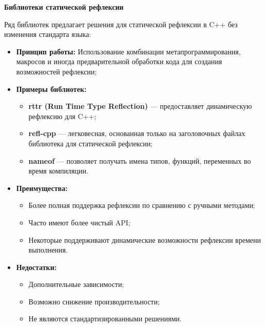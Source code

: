         \textbf{Библиотеки статической рефлексии}
        
            Ряд библиотек предлагает решения для статической рефлексии в C++ без изменения стандарта языка:
            
            \begin{itemize}
                \item \textbf{Принцип работы:} Использование комбинации метапрограммирования, макросов и иногда предварительной обработки кода для создания возможностей рефлексии;
                
                \item \textbf{Примеры библиотек:}
                \begin{itemize}
                    \item \textbf{rttr (Run Time Type Reflection)} — предоставляет динамическую рефлексию для C++;
                    \item \textbf{refl-cpp} — легковесная, основанная только на заголовочных файлах библиотека для статической рефлексии;
                    \item \textbf{nameof} — позволяет получать имена типов, функций, переменных во время компиляции.
                \end{itemize}
                
                \item \textbf{Преимущества:}
                \begin{itemize}
                    \item Более полная поддержка рефлексии по сравнению с ручными методами;
                    \item Часто имеют более чистый API;
                    \item Некоторые поддерживают динамические возможности рефлексии времени выполнения.
                \end{itemize}
                
                \item \textbf{Недостатки:}
                \begin{itemize}
                    \item Дополнительные зависимости;
                    \item Возможно снижение производительности;
                    \item Не являются стандартизированными решениями.
                \end{itemize}
            \end{itemize}

